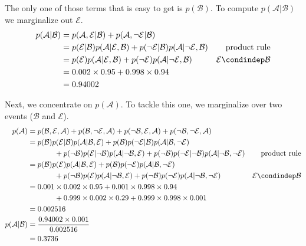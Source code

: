 \documentclass[assignment02_Solutions]{subfiles}
\begin{document}
\begin{exercise}[(60 minutes)]
\begin{boxedsolution}
The only one of those terms that is easy to get is $p(\mathcal{B})$.  To compute $p(\mathcal{A} | \mathcal{B})$ we marginalize out $\mathcal{E}$.
\begin{align}
p(\mathcal{A} | \mathcal{B}) &= p(\mathcal{A}, \mathcal{E} | \mathcal{B}) + p(\mathcal{A}, \neg \mathcal{E} | \mathcal{B}) \nonumber \\
&= p(\mathcal{E} | \mathcal{B}) p(\mathcal{A} | \mathcal{E}, \mathcal{B}) + p(\neg \mathcal{E} | \mathcal{B}) p(\mathcal{A} | \neg \mathcal{E}, \mathcal{B}) & \mbox{product rule} \nonumber \\
&=  p(\mathcal{E}) p(\mathcal{A} | \mathcal{E}, \mathcal{B}) + p(\neg \mathcal{E}) p(\mathcal{A} | \neg \mathcal{E}, \mathcal{B})  &  \mathcal{E} \condindep \mathcal{B} \nonumber \\
&= 0.002 \times 0.95 + 0.998 \times 0.94 \nonumber \\
&= 0.94002 \nonumber
\end{align}

Next, we concentrate on $p(\mathcal{A})$.  To tackle this one, we marginalize over two events ($\mathcal{B}$ and $\mathcal{E}$).
\begin{align}
p(\mathcal{A}) &= p(\mathcal{B}, \mathcal{E}, \mathcal{A}) +  p(\mathcal{B}, \neg \mathcal{E}, \mathcal{A}) + p(\neg \mathcal{B}, \mathcal{E}, \mathcal{A}) + p(\neg \mathcal{B}, \neg \mathcal{E}, \mathcal{A}) \nonumber \\
&= p(\mathcal{B}) p(\mathcal{E} | \mathcal{B}) p(\mathcal{A} | \mathcal{B}, \mathcal{E}) +   p(\mathcal{B}) p(\neg \mathcal{E} | \mathcal{B}) p(\mathcal{A} | \mathcal{B}, \neg \mathcal{E}) \nonumber \\
 &\hspace{0.5in} + p(\neg \mathcal{B}) p(\mathcal{E} | \neg \mathcal{B}) p(\mathcal{A} | \neg \mathcal{B}, \mathcal{E}) +  p(\neg \mathcal{B}) p(\neg \mathcal{E} | \neg \mathcal{B}) p(\mathcal{A} | \neg \mathcal{B}, \neg \mathcal{E}) &\mbox{product rule} \nonumber \\
 &= p(\mathcal{B}) p(\mathcal{E}) p(\mathcal{A} | \mathcal{B}, \mathcal{E}) +   p(\mathcal{B}) p(\neg \mathcal{E}) p(\mathcal{A} | \mathcal{B}, \neg \mathcal{E})  \nonumber \\
 &\hspace{0.5in} + p(\neg \mathcal{B}) p(\mathcal{E}) p(\mathcal{A} | \neg \mathcal{B}, \mathcal{E}) +  p(\neg \mathcal{B}) p(\neg \mathcal{E}) p(\mathcal{A} | \neg \mathcal{B}, \neg \mathcal{E})  & \mathcal{E} \condindep \mathcal{B}  \nonumber \\
 &= 0.001 \times 0.002 \times 0.95 + 0.001 \times 0.998 \times 0.94 \nonumber \\
 &\hspace{0.5in} + 0.999 \times 0.002 \times 0.29 + 0.999 \times 0.998 \times 0.001 \nonumber \\
 &= 0.002516 \nonumber \\
p(\mathcal{A} | \mathcal{B}) &= \frac{0.94002 \times 0.001}{0.002516} \nonumber \\
&= 0.3736 \nonumber
\end{align}
\end{boxedsolution}


\end{exercise}
\end{document}
